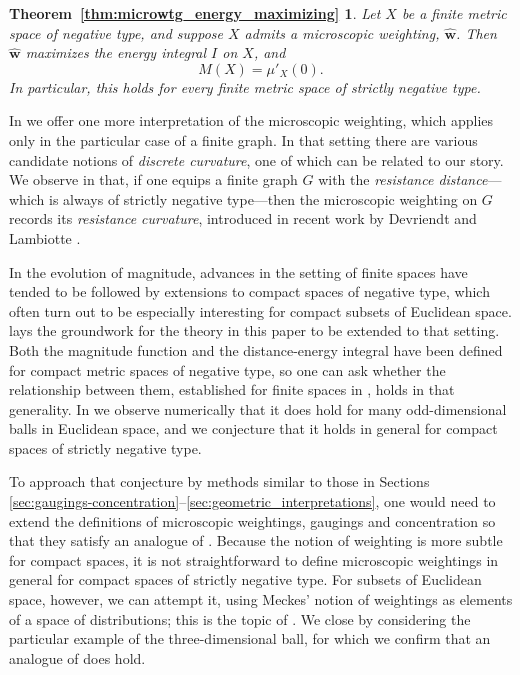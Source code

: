 \documentclass[a4paper, oneside, reqno]{amsart}
\newtheorem*{thmmicrowtg_energy_maximizing}
{Theorem~\ref{thm:microwtg_energy_maximizing}}
\theoremstyle{definition}
\theoremstyle{remark}
\numberwithin{equation}{section}
\newcommand{\demph}[1]{\emph{#1}}
\renewcommand{\vec}{\mathbf}
\newcommand{\micro}{\widehat{\vec{w}}}
\begin{document}
\begin{thmmicrowtg_energy_maximizing}
Let \(X\) be a finite metric space of negative type, and suppose \(X\) admits a microscopic weighting, \(\micro\). Then \(\micro\) maximizes the energy integral \(I\) on \(X\), and
\[M(X) = \mu'_X(0).\]
In particular, this holds for every finite metric space of strictly negative type.
\end{thmmicrowtg_energy_maximizing}

In  we offer one more interpretation of the microscopic weighting, which applies only in the particular case of a finite graph. In that setting there are various candidate notions of \demph{discrete curvature}, one of which can be related to our story. We observe in  that, if one equips a finite graph \(G\) with the \demph{resistance distance}---which is always of strictly negative type---then the microscopic weighting on \(G\) records its \demph{resistance curvature}, introduced in recent work by Devriendt and Lambiotte \cite{DevriendtLambiotte}.

In the evolution of magnitude, advances in the setting of finite spaces have tended to be followed by extensions to compact spaces of negative type, which often turn out to be especially interesting for compact subsets of Euclidean space.  lays the groundwork for the theory in this paper to be extended to that setting. Both the magnitude function and the distance-energy integral have been defined for compact metric spaces of negative type, so one can ask whether the relationship between them, established for finite spaces in , holds in that generality. In  we observe numerically that it does hold for many odd-dimensional balls in Euclidean space, and we conjecture that it holds in general for compact spaces of strictly negative type. 

To approach that conjecture by methods similar to those in Sections \ref{sec:gaugings-concentration}--\ref{sec:geometric_interpretations}, one would need to extend the definitions of microscopic weightings, gaugings and concentration so that they satisfy an analogue of . Because the notion of weighting is more subtle for compact spaces, it is not straightforward to define microscopic weightings in general for compact spaces of strictly negative type. For subsets of Euclidean space, however, we can attempt it, using Meckes' notion of weightings as elements of a space of distributions; this is the topic of . We close by considering the particular example of the three-dimensional ball, for which we confirm that an analogue of  does hold.
\end{document}
